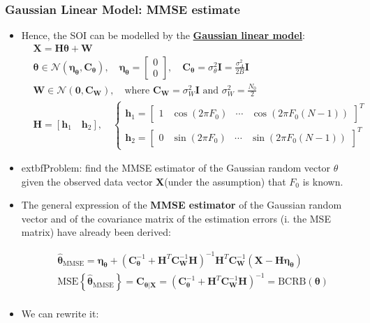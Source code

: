 \subsubsection{Gaussian Linear Model: MMSE estimate}
\begin{itemize}
\item Hence, the SOI can be modelled by the \underline{\textbf{Gaussian linear model}}:
\begin{align*}
&\mathbf{X} = \mathbf{H}\boldsymbol{\theta} + \mathbf{W} \\
&\boldsymbol{\theta}\in\mathcal{N}(\boldsymbol{\eta}_{\boldsymbol{\theta}}, \mathbf{C}_{\boldsymbol{\theta}}), \quad \boldsymbol{\eta}_{\boldsymbol{\theta}} = \begin{bmatrix} 0 \\ 0 \end{bmatrix}, \quad \mathbf{C}_{\boldsymbol{\theta}} = \sigma_{\theta}^{2}\mathbf{I} = \frac{\sigma_{A}^{2}}{2B}\mathbf{I} \\
&\mathbf{W}\in\mathcal{N}(\mathbf{0}, \mathbf{C}_{\mathbf{W}}), \quad \text{where } \mathbf{C}_{\mathbf{W}} = \sigma_{W}^{2}\mathbf{I} \text{ and } \sigma_{W}^{2} = \frac{N_{0}}{2} \\
&\mathbf{H} = [\mathbf{h}_{1} \quad \mathbf{h}_{2}], \quad
\begin{cases}
\mathbf{h}_{1} = \begin{bmatrix} 1 & \cos(2\pi F_{0}) & \cdots & \cos(2\pi F_{0}(N-1)) \end{bmatrix}^{T} \\
\mathbf{h}_{2} = \begin{bmatrix} 0 & \sin(2\pi F_{0}) & \cdots & \sin(2\pi F_{0}(N-1)) \end{bmatrix}^{T}
\end{cases}
\end{align*}
\item extbf{Problem}: find the MMSE estimator of the Gaussian random vector \(\theta\) given the observed data vector \textbf{X}(under the assumption) that \(F_0\) is known.
\item The general expression of the \textbf{MMSE estimator} of the Gaussian random vector and of the covariance matrix of the estimation errors (i. the MSE matrix) have already been derived:

\begin{align*}
&\mathbf{\hat{\boldsymbol{\theta}}}_{\text{MMSE}} = \boldsymbol{\eta}_{\boldsymbol{\theta}} + \left(\mathbf{C}_{\boldsymbol{\theta}}^{-1} + \mathbf{H}^{T}\mathbf{C}_{\mathbf{W}}^{-1}\mathbf{H}\right)^{-1}\mathbf{H}^{T}\mathbf{C}_{\mathbf{W}}^{-1} \left(\mathbf{X} - \mathbf{H}\boldsymbol{\eta}_{\boldsymbol{\theta}}\right) \\
&\text{MSE}\left\{\mathbf{\hat{\boldsymbol{\theta}}}_{\text{MMSE}}\right\} = \mathbf{C}_{\boldsymbol{\theta}|\mathbf{X}} = \left(\mathbf{C}_{\boldsymbol{\theta}}^{-1} + \mathbf{H}^{T}\mathbf{C}_{\mathbf{W}}^{-1}\mathbf{H}\right)^{-1} = \text{BCRB}(\boldsymbol{\theta}) \\
\end{align*}
\item We can rewrite it:


\end{itemize}
